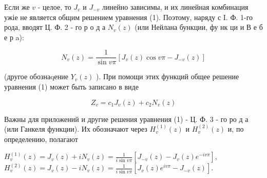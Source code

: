 \documentclass[10pt]{article}
\begin{document}
Если же $v$ - целое, то $J_{v}$ и $J_{-v}$ линейно зависимы, и их линейная комбинация ужіе не является общим решением уравнения (1). Поэтому, наряду с I. Ф. 1-го рода, вводят Ц. Ф. 2 - го р о д а $N_{v}(z)$ (или Нейлана бункции, фу нк ци и В е б е р a):



\[

N_{v}(z)=\frac{1}{\sin v \pi}\left[J_{v}(z) \cos v \pi-J_{-v}(z)\right]

\]



(другое обознаqение $Y_{v}(z)$ ). При помощи этих функций общее решение уравнения (1) может быть записано в виде



\[

Z_{v}=c_{1} J_{v}(z)+c_{2} N_{v}(z)

\]



Важны для приложений и другие решения уравнения (1) - Ц. Ф. 3 - го ро д а (или Ганкеля функции). Их обозначают через $H_{v}^{(1)}(z)$ и $H_{v}^{(2)}(z)$ и, по определению, полагают



$H_{v}^{(1)}(z)=J_{v}(z)+i N_{v}(z)=\frac{1}{i \sin v \pi}\left[J_{-v}(z)-J_{v}(z) e^{-i v \pi}\right]$, $H_{v}^{(2)}(z)=J_{v}(z)-i N_{v}(z)=\frac{1}{i \sin v \pi}\left[J_{v}(z) e^{i v \pi}-J_{-v}(z)\right]$.
\end{document}
